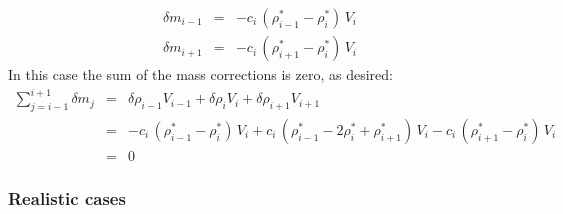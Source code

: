 \begin{eqnarray}
\delta m_{i-1} &=& - c_i \, (\rho_{i-1}^* - \rho_i^*) \, V_i \nonumber\\
\delta m_{i+1} &=& - c_i \, (\rho_{i+1}^* - \rho_i^*) \, V_i \nonumber
\end{eqnarray}
In this case the sum of the mass corrections is zero, as desired:
\begin{eqnarray}
\sum_{j=i-1}^{i+1} \delta m_j &=& \delta \rho_{i-1} V_{i-1} + \delta \rho_i V_i + \delta \rho_{i+1}V_{i+1} \nonumber\\
&=& - c_i \, (\rho_{i-1}^* - \rho_i^*) \, V_i + c_i \, (\rho_{i-1}^* - 2 \rho_i^* + \rho_{i+1}^*) \, V_i - c_i \, (\rho_{i+1}^* - \rho_i^*) \, V_i \nonumber\\
&=& 0 \nonumber
\end{eqnarray}

\subsubsection{Realistic cases}

